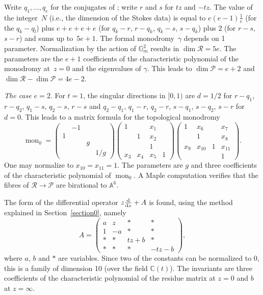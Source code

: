 \documentclass[10pt,a4paper]{amsart}
\numberwithin{equation}{section}
\begin{document}
Write $q_1,\dots , q_e$ for the conjugates of ; write $r$ and $s$ for $tz$ and $-tz$. The value of the integer~$N$ (i.e., the dimension of the Stokes data) is equal to $ e(e-1)\frac{1}{e}$ (for the $q_k-q_l$) plus $e+e+e+e$ (for $q_k-r$, $r-q_k$, $q_k-s$, $s-q_k$) plus $2$ (for $r-s$, $s-r$) and sums up to~${5e+1}$. The formal monodromy~$\gamma$ depends on 1 parameter. Normalization by the action of $\mathbb{G}_m^2$
results in $\dim \mathcal{R}=5e$. The parameters are the $e+1$ coefficients of the characteristic polynomial of the monodromy at~${z=0}$ and the eigenvalues of $\gamma$. This leads to $\dim \mathcal{P}=e+2$ and $\dim \mathcal{R}-\dim \mathcal{P}=4e-2$.

{\it The case $e=2$}. For $t=1$, the singular directions in $[0,1)$ are
$d=1/2$ for $r-q_1$, $r-q_2$, $q_1-s$, $q_2-s$, $r-s$ and $q_2-q_1$, $q_1-r$, $q_2-r$, $s-q_1$, $s-q_2$, $s-r$ for $d=0$. This leads to a matrix formula for the topological monodromy
\[\operatorname{mon}_0=\begin{pmatrix} & -1& & \\ 1& & & \\ & & g& \\ & & & 1/g\end{pmatrix}
\begin{pmatrix} 1 & & x_1& \\ & 1& x_2& \\ & & 1& \\ x_3&x_4 & x_5& 1\end{pmatrix}
\begin{pmatrix} 1&x_6 & & x_7\\ & 1& &x_8 \\ x_9&x_{10} & 1&x_{11} \\ & & & 1\end{pmatrix}. \]
One may normalize to $x_{10}=x_{11}=1$. The parameters are $g$ and three coefficients of the characteristic polynomial of $\operatorname{mon}_0$.
A Maple computation verifies that the fibres of $\mathcal{R}\rightarrow \mathcal{P}$ are
 birational to $\mathbb{A}^6$.

The form of the differential operator $z\frac{{\rm d}}{{\rm d}z}+A$ is found, using the method explained in
Section~\ref{section0}, namely
\[ A= \begin{pmatrix} a&z & *&* \\ 1&-a & *&* \\ *&* &tz+b &* \\ *&* &* &-tz-b \end{pmatrix},\]
 where $a$, $b$ and $*$ are variables. Since two of the constants can be normalized to $0$, this is a family of dimension 10
 (over the field $\mathbb{C}(t)$).
 The invariants are three coefficients of the characteristic polynomial of the residue matrix at $z=0$ and $b$
 at $z=\infty$.
\end{document}
